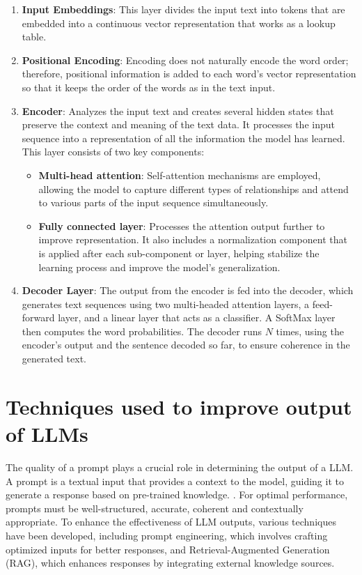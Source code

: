 \begin{enumerate}
    \item \textbf{Input Embeddings}: This layer divides the input text into tokens that are embedded into a continuous vector representation that works as a lookup table.
    \item \textbf{Positional Encoding}: Encoding does not naturally encode the word order; therefore, positional information is added to each word’s vector representation so that it keeps the order of the words as in the text input.
    \item \textbf{Encoder}: Analyzes the input text and creates several hidden states that preserve the context and meaning of the text data. It processes the input sequence into a representation of all the information the model has learned. This layer consists of two key components:
    \begin{itemize}
        \item \textbf{Multi-head attention}: Self-attention mechanisms are employed, allowing the model to capture different types of relationships and attend to various parts of the input sequence simultaneously.
        \item \textbf{Fully connected layer}: Processes the attention output further to improve representation. It also includes a normalization component that is applied after each sub-component or layer, helping stabilize the learning process and improve the model’s generalization.
    \end{itemize}
    \item \textbf{Decoder Layer}: The output from the encoder is fed into the decoder, which generates text sequences using two multi-headed attention layers, a feed-forward layer, and a linear layer that acts as a classifier. A SoftMax layer then computes the word probabilities. The decoder runs \(N\) times, using the encoder’s output and the sentence decoded so far, to ensure coherence in the generated text.
\end{enumerate}

\section{Techniques used to improve output of LLMs}
The quality of a prompt plays a crucial role in determining the output of a LLM. A prompt is a textual input that provides a context to the model, guiding it to generate a response based on pre-trained knowledge. \cite{brown2020languagemodelsfewshotlearners}. For optimal performance, prompts must be well-structured, accurate, coherent and contextually appropriate.
To enhance the effectiveness of LLM outputs, various techniques have been developed, including prompt engineering, which involves crafting optimized inputs for better responses, and Retrieval-Augmented Generation (RAG), which enhances responses by integrating external knowledge sources.



